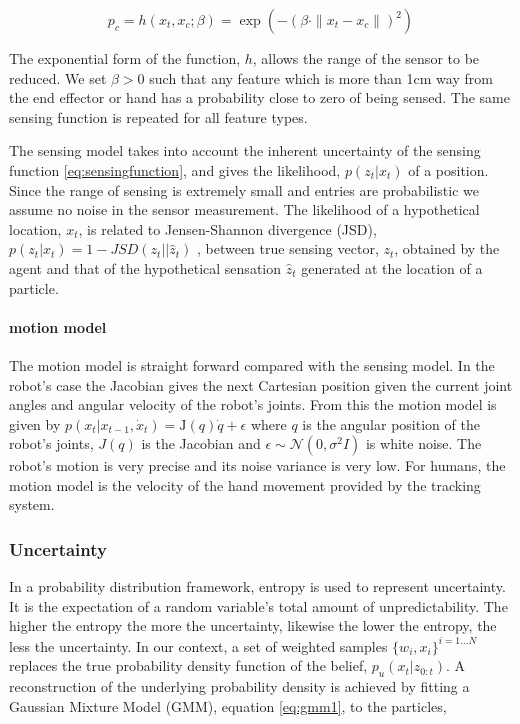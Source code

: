\begin{equation}\label{eq:sensingfunction}
  p_c = h(x_t,x_c;\beta) = \exp\left( -\left(\beta \cdot \|x_t - x_c\|\right)^2 \right)
\end{equation}

The exponential form of the function, $h$, allows the range of the sensor to be reduced. We set $\beta > 0$ such that 
any feature which is more than 1cm way from the end effector or hand has a probability close to zero of being sensed. 
The same sensing function is repeated for all feature types.

The sensing model takes into account the inherent uncertainty of the sensing function \ref{eq:sensingfunction}, 
and gives the likelihood, $p(z_t|x_t)$ of a position. Since the range of sensing is extremely small and entries are probabilistic we assume no noise in the sensor measurement.
The likelihood of a hypothetical location, $x_t$,  is related to Jensen-Shannon divergence (JSD), $p(z_t|x_t) = 1 - JSD(z_t||\hat{z}_t)$ , between true sensing vector,
$z_t$, obtained by the agent and that of the hypothetical sensation $\hat{z}_t$ generated at the location of a particle. 

\paragraph{motion model}
The motion model is straight forward compared with the sensing model. In the robot's case the Jacobian gives the next 
Cartesian position given the current joint angles and angular velocity of the robot's joints.
From this the motion model is given by $ p(x_{t}|x_{t-1},\dot{x}_{t}) = \mathrm{J}(q)\dot{q} + \epsilon$ where $q$ is 
the angular position of the robot's joints, $J(q)$ is the Jacobian and $\epsilon \sim \mathcal{N}(0,\sigma^{2}I)$ is white noise. The robot's motion is very precise and its noise variance is very low. For humans, 
the motion model is the velocity of the hand movement provided by the tracking system.

\subsubsection{Uncertainty}


In a probability distribution framework, entropy is used to represent uncertainty. It is the expectation of a random variable's total amount 
of unpredictability. The higher the entropy the more the uncertainty, likewise the lower the entropy, the less the uncertainty. 
In our context, a set of weighted samples $\{w_{i},x_{i}\}^{i=1\dots N}$ replaces the true
probability density function of the belief, $p_u(x_t|z_{0:t})$. A reconstruction of 
the underlying probability density is achieved by fitting a Gaussian  Mixture Model (GMM), equation \ref{eq:gmm1}, to the particles,

